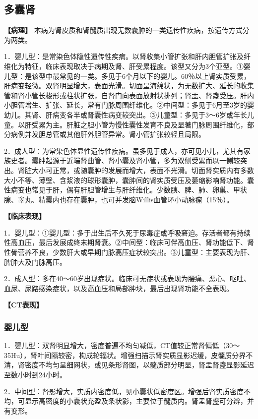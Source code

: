 \subsection{多囊肾}

\textbf{【病理】}
本病为肾皮质和肾髓质出现无数囊肿的一类遗传性疾病，按遗传方式分为两类。

1．婴儿型：是常染色体隐性遗传性疾病。以肾收集小管扩张和肝内胆管扩张及纤维化为特征，临床表现取决于病期及肾、肝受累程度。该型又分为3个亚型。①婴儿型：是该型中最常见的一类。多见于6个月以下的婴儿。60％以上肾实质受累，肝病变轻微。双肾明显增大，表面光滑。切面呈海绵状，为无数扩大、延长的收集管和肾小管长梭形或柱状扩张，自肾门向表面放射状排列；肾盂、肾盏受压。肝内小胆管增生、扩张、延长，常有门脉周围纤维化。②中间型：多见于6月至3岁的婴幼儿。其肾、肝病变各半或肾囊性病变较突出。③儿童型：多见于3～6岁或年长儿童。以肝受累为主。肝脏之胆小管为慢性囊性发育不良及显著门脉周围纤维化，部分病例并发胆总管或其他肝外胆管异常。肾小管扩张较轻且局限。

2．成人型：为常染色体显性遗传性疾病。虽多见于成人，亦可见小儿，尤其有家族史者。囊肿起源于近端肾曲管、肾小囊及肾小管，多为双侧受累而以一侧较突出。肾脏大小可正常，或随囊肿的发展而增大，表面不光滑。切面肾实质内有多数大小不等、薄壁、含浆液的球形囊肿，囊肿间的肾实质受压及萎缩影响肾功能。囊性病变也常见于肝，偶有肝胆管增生与肝纤维化。少数胰、脾、肺、卵巢、甲状腺、睾丸、精囊内也存在囊肿，也可并发脑Willis血管环小动脉瘤（15％）。

\textbf{【临床表现】}

1．婴儿型：①婴儿型：多于出生后不久死于尿毒症或呼吸窘迫。存活者都有持续性高血压，最后发展成终末期肾衰。②中间型：临床可伴高血压、肾功能低下、肾性骨营养不良，少数肝大或早期门脉高压症状较突出。③儿童型：主要表现为肝、脾肿大及门脉高压。

2．成人型：多在40～60岁出现症状。临床可无症状或表现为腰痛、恶心、呕吐、血尿、尿路感染症状，以及高血压和局部肿块，最后出现肾功能不全表现。

\textbf{【CT表现】}

\subsubsection{婴儿型}

1．婴儿型：双肾明显增大，密度普遍不均匀减低，CT值较正常肾偏低（30～35Hu），肾叶间隔较密，构成轮辐状。增强扫描示肾实质显影迟缓，皮髓质分界不清，肾密度不均匀呈细网状，或见条形肾图，以髓质部分明显，肾盂肾盏显影延迟至数小时到24小时。

2．中间型：肾影增大，实质内密度低，见小囊状低密度区。增强后肾实质密度不均，可显示高密度的小囊状充盈及条状影，主要位于髓质内。肾盂肾盏可分辨，并有变形。

